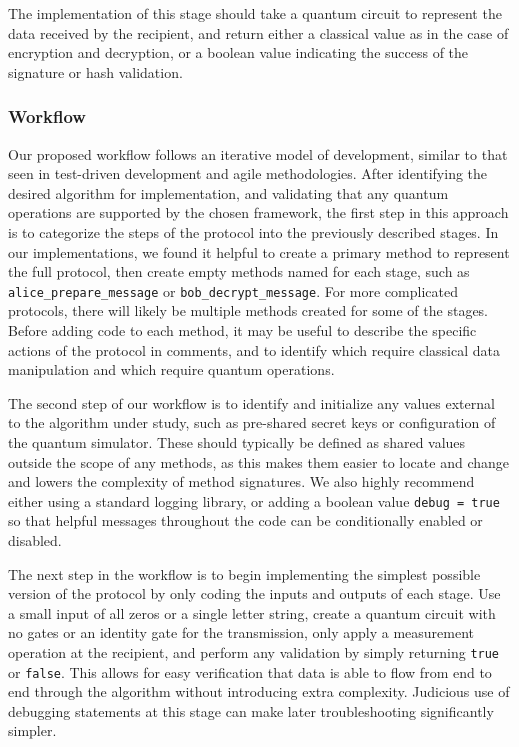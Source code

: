 \documentclass[sigconf]{acmart}
\begin{document}
The implementation of this stage should take a quantum circuit to represent the data received by the recipient, and return either a classical value as in the case of encryption and decryption, or a boolean value indicating the success of the signature or hash validation.

\subsubsection{Workflow}
Our proposed workflow follows an iterative model of development, similar to that seen in test-driven development and agile methodologies. After identifying the desired algorithm for implementation, and validating that any quantum operations are supported by the chosen framework, the first step in this approach is to categorize the steps of the protocol into the previously described stages. In our implementations, we found it helpful to create a primary method to represent the full protocol, then create empty methods named for each stage, such as \texttt{alice\_prepare\_message} or \texttt{bob\_decrypt\_message}. For more complicated protocols, there will likely be multiple methods created for some of the stages. Before adding code to each method, it may be useful to describe the specific actions of the protocol in comments, and to identify which require classical data manipulation and which require quantum operations.

The second step of our workflow is to identify and initialize any values external to the algorithm under study, such as pre-shared secret keys or configuration of the quantum simulator. These should typically be defined as shared values outside the scope of any methods, as this makes them easier to locate and change and lowers the complexity of method signatures. We also highly recommend either using a standard logging library, or adding a boolean value \texttt{debug = true} so that helpful messages throughout the code can be conditionally enabled or disabled.

The next step in the workflow is to begin implementing the simplest possible version of the protocol by only coding the inputs and outputs of each stage. Use a small input of all zeros or a single letter string, create a quantum circuit with no gates or an identity gate for the transmission, only apply a measurement operation at the recipient, and perform any validation by simply returning \texttt{true} or \texttt{false}. This allows for easy verification that data is able to flow from end to end through the algorithm without introducing extra complexity. Judicious use of debugging statements at this stage can make later troubleshooting significantly simpler. %
\end{document}
